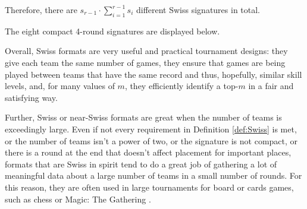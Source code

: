 {{        Therefore, there are $s_{r-1} \cdot \sum_{i=1}^{r-1}s_i$ different Swiss signatures in total.
    }{}

    The eight compact 4-round signatures are displayed below.

    
    Overall, Swiss formats are very useful and practical tournament designs: they give each team the same number of games, they ensure that games are being played between teams that have the same record and thus, hopefully, similar skill levels, and, for many values of $m$, they efficiently identify a top-$m$ in a fair and satisfying way.

    Further, Swiss or near-Swiss formats are great when the number of teams is exceedingly large. Even if not every requirement in Definition \ref{def:Swiss} is met, or the number of teams isn't a power of two, or the signature is not compact, or there is a round at the end that doesn't affect placement for important places, formats that are Swiss in spirit tend to do a great job of gathering a lot of meaningful data about a large number of teams in a small number of rounds. For this reason, they are often used in large tournaments for board or cards games, such as chess or Magic: The Gathering \cite{ifno_mtg}.
}